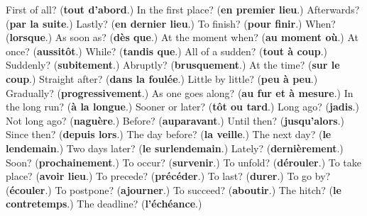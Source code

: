 \begin{tcolorbox}[breakable,colback=teal!4,colframe=teal!35!black,title={Before you move on}]
First of all? (\textbf{tout d'abord}.) In the first place? (\textbf{en premier lieu}.) Afterwards? (\textbf{par la suite}.) Lastly? (\textbf{en dernier lieu}.) To finish? (\textbf{pour finir}.) When? (\textbf{lorsque}.) As soon as? (\textbf{dès que}.) At the moment when? (\textbf{au moment où}.) At once? (\textbf{aussitôt}.) While? (\textbf{tandis que}.) All of a sudden? (\textbf{tout à coup}.) Suddenly? (\textbf{subitement}.) Abruptly? (\textbf{brusquement}.) At the time? (\textbf{sur le coup}.) Straight after? (\textbf{dans la foulée}.) Little by little? (\textbf{peu à peu}.) Gradually? (\textbf{progressivement}.) As one goes along? (\textbf{au fur et à mesure}.) In the long run? (\textbf{à la longue}.) Sooner or later? (\textbf{tôt ou tard}.) Long ago? (\textbf{jadis}.) Not long ago? (\textbf{naguère}.) Before? (\textbf{auparavant}.) Until then? (\textbf{jusqu'alors}.) Since then? (\textbf{depuis lors}.) The day before? (\textbf{la veille}.) The next day? (\textbf{le lendemain}.) Two days later? (\textbf{le surlendemain}.) Lately? (\textbf{dernièrement}.) Soon? (\textbf{prochainement}.) To occur? (\textbf{survenir}.) To unfold? (\textbf{dérouler}.) To take place? (\textbf{avoir lieu}.) To precede? (\textbf{précéder}.) To last? (\textbf{durer}.) To go by? (\textbf{écouler}.) To postpone? (\textbf{ajourner}.) To succeed? (\textbf{aboutir}.) The hitch? (\textbf{le contretemps}.) The deadline? (\textbf{l'échéance}.)
\end{tcolorbox}
